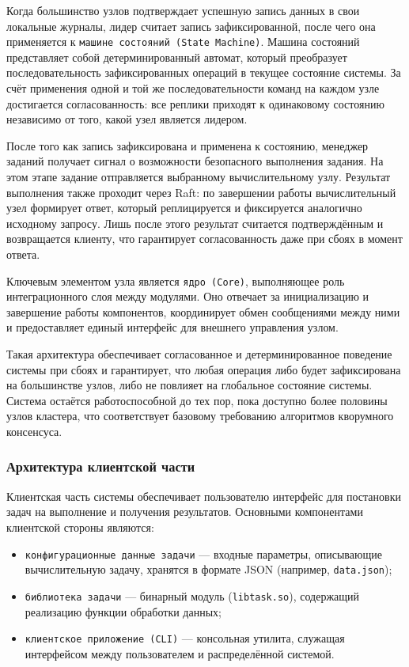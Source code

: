 Когда большинство узлов подтверждает успешную запись данных в свои
локальные журналы, лидер считает запись зафиксированной, после чего
она применяется к \texttt{машине состояний (State Machine)}. Машина
состояний представляет собой детерминированный автомат, который
преобразует последовательность зафиксированных операций в текущее
состояние системы. За счёт применения одной и той же
последовательности команд на каждом узле достигается согласованность:
все реплики приходят к одинаковому состоянию независимо от того, какой
узел является лидером.

После того как запись зафиксирована и применена к состоянию, менеджер
заданий получает сигнал о возможности безопасного выполнения задания.
На этом этапе задание отправляется выбранному вычислительному узлу.
Результат выполнения также проходит через Raft: по завершении работы
вычислительный узел формирует ответ, который реплицируется и
фиксируется аналогично исходному запросу. Лишь после этого результат
считается подтверждённым и возвращается клиенту, что гарантирует
согласованность даже при сбоях в момент ответа.

Ключевым элементом узла является \texttt{ядро (Core)}, выполняющее роль
интеграционного слоя между модулями. Оно отвечает за инициализацию и
завершение работы компонентов, координирует обмен сообщениями между
ними и предоставляет единый интерфейс для внешнего управления узлом.

Такая архитектура обеспечивает согласованное и детерминированное
поведение системы при сбоях и гарантирует, что любая операция либо
будет зафиксирована на большинстве узлов, либо не повлияет на
глобальное состояние системы. Система остаётся работоспособной до тех
пор, пока доступно более половины узлов кластера, что соответствует
базовому требованию алгоритмов кворумного консенсуса.

\subsubsection{Архитектура клиентской части}

Клиентская часть системы обеспечивает пользователю интерфейс для
постановки задач на выполнение и получения результатов. Основными
компонентами клиентской стороны являются:
\begin{itemize}
    \item \texttt{конфигурационные данные задачи} --- входные параметры,
    описывающие вычислительную задачу, хранятся в формате JSON
    (например, \texttt{data.json});
    \item \texttt{библиотека задачи} --- бинарный модуль
    (\texttt{libtask.so}), содержащий реализацию функции обработки
    данных;
    \item \texttt{клиентское приложение (CLI)} --- консольная утилита,
    служащая интерфейсом между пользователем и распределённой
    системой.
\end{itemize}

